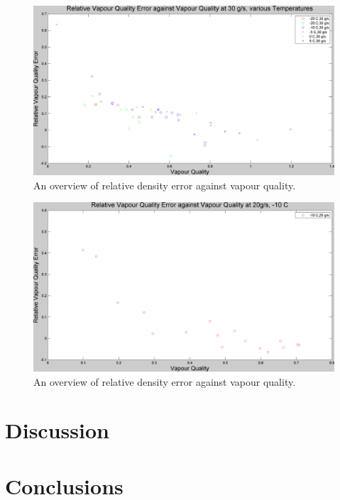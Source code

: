 \documentclass{report}
\begin{document}
\begin{figure}
\includegraphics[width=\textwidth]{plots/fig9}
\caption{An overview of relative density error against vapour quality.}
\label{plot:9}
\end{figure}
\begin{figure}
\includegraphics[width=\textwidth]{plots/fig10}
\caption{An overview of relative density error against vapour quality.}
\label{plot:10}
\end{figure}
\chapter{Discussion}

\chapter{Conclusions}
\end{document}
